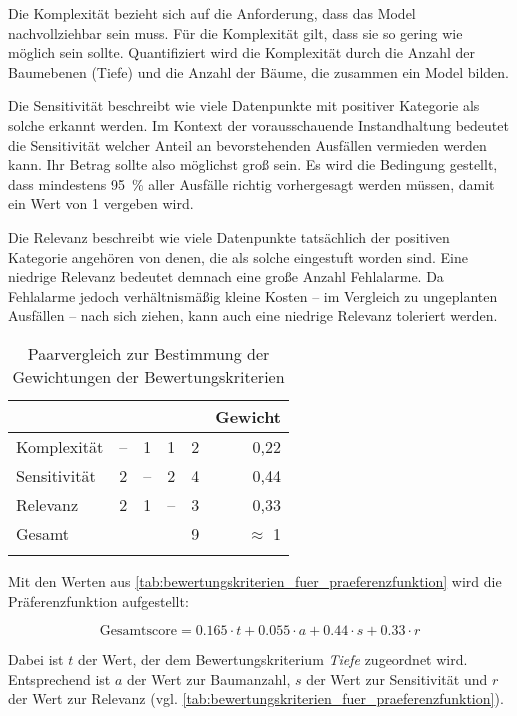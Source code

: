 Die Komplexität bezieht sich auf die Anforderung, dass das Model nachvollziehbar sein muss. Für die Komplexität gilt, dass sie so gering wie möglich sein sollte. Quantifiziert wird die Komplexität durch die Anzahl der Baumebenen (Tiefe) und die Anzahl der Bäume, die zusammen ein Model bilden.

Die Sensitivität beschreibt wie viele Datenpunkte mit positiver Kategorie als solche erkannt werden. Im Kontext der vorausschauende Instandhaltung bedeutet die Sensitivität welcher Anteil an bevorstehenden Ausfällen vermieden werden kann. Ihr Betrag sollte also möglichst groß sein. Es wird die Bedingung gestellt, dass mindestens \SI{95}{\percent} aller Ausfälle richtig vorhergesagt werden müssen, damit ein Wert von \num{1} vergeben wird.

Die Relevanz beschreibt wie viele Datenpunkte tatsächlich der positiven Kategorie angehören von denen, die als solche eingestuft worden sind. Eine niedrige Relevanz bedeutet demnach eine große Anzahl Fehlalarme. Da Fehlalarme jedoch verhältnismäßig kleine Kosten -- im Vergleich zu ungeplanten Ausfällen -- nach sich ziehen, kann auch eine niedrige Relevanz toleriert werden.

\begin{table}[h]
	\begin{tabularx}{\textwidth}{|l|ccc|c|r|}
		\hline
		& \rotatebox{90}{Komplexität} & \rotatebox{90}{Sensitivität} & \rotatebox{90}{Relevanz} & \rotatebox{90}{Summe} & Gewicht\\
		\hline
		Komplexität & -- & 1 & 1 & 2 & 0,22\\
		Sensitivität & 2 & -- & 2 & 4 & 0,44\\
		Relevanz & 2 & 1 & -- & 3 & 0,33\\
		\hline
		\hline
		Gesamt & \multicolumn{2}{c}{} & & 9 & $\approx$ 1\\
		\hline
		\caption{Paarvergleich zur Bestimmung der Gewichtungen der Bewertungskriterien}
		\label{tab:paarvergleich}
	\end{tabularx}
\end{table}

Mit den Werten aus \cref{tab:bewertungskriterien_fuer_praeferenzfunktion} wird die Präferenzfunktion aufgestellt:

\begin{equation*}
	\text{Gesamtscore}=0.165\cdot t+
	0.055\cdot a+0.44\cdot s+0.33\cdot r
	\label{eq:praeferenzfunktion}
\end{equation*}

Dabei ist $t$ der Wert, der dem Bewertungskriterium \textit{Tiefe} zugeordnet wird. Entsprechend ist $a$ der Wert zur Baumanzahl, $s$ der Wert zur Sensitivität und $r$ der Wert zur Relevanz (vgl. \cref{tab:bewertungskriterien_fuer_praeferenzfunktion}).
